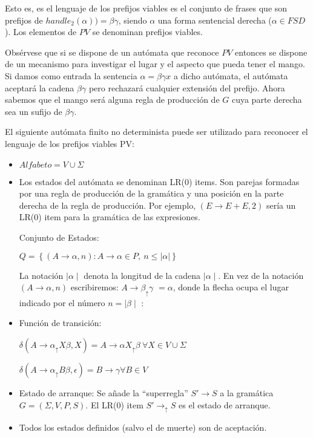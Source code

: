Esto es, es el lenguaje de los prefijos viables es el 
conjunto de frases que son prefijos de 
$handle_2(\alpha)) =  \beta \gamma$, 
siendo $\alpha$ una forma sentencial derecha ($\alpha \in FSD$). Los
elementos de $PV$ se denominan prefijos viables.

Obsérvese que si se dispone de un autómata que reconoce 
$PV$ entonces se dispone de un mecanismo para investigar el lugar y 
el aspecto que pueda tener el mango. Si damos como 
entrada la sentencia $\alpha = \beta \gamma x$
a dicho autómata, el autómata aceptará la cadena $\beta \gamma$ pero rechazará
cualquier extensión del prefijo. Ahora sabemos que el mango 
será alguna regla de producción de $G$ cuya parte derecha 
sea un sufijo de  $\beta \gamma$.

\begin{definition}
\label{definition:eyappslrautomata}
El siguiente autómata finito no determinista puede ser utilizado para
reconocer el lenguaje de los prefijos viables PV:
\begin{itemize}
\item
$Alfabeto = V \cup \Sigma$
\item
Los estados del autómata se denominan LR(0) items. Son parejas formadas
por una regla de producción de la gramática y una posición en la parte derecha 
de la regla de producción. Por ejemplo, $(E \rightarrow E + E, 2)$ sería un
LR(0) item para la gramática de las expresiones.

Conjunto de Estados:

$Q =  \left \{ (A \rightarrow \alpha, n) :  A \rightarrow \alpha \in P,\ n \le |\alpha| \right \}$

 La notación $\mid \alpha \mid$ denota la longitud de la cadena $\mid \alpha \mid$.
 En vez de la notación $(A \rightarrow \alpha, n)$ escribiremos: 
 $A \rightarrow \beta _\uparrow \gamma$ $ = \alpha$, 
 donde la flecha ocupa el lugar indicado por el número $n = \mid \beta \mid$ :
\item
Función de transición:

$\delta(A \rightarrow \alpha _\uparrow X \beta, X) = A \rightarrow \alpha X _\uparrow \beta\ \forall X \in  V \cup \Sigma$ 

$\delta(A \rightarrow \alpha _\uparrow B \beta, \epsilon) = B \rightarrow \gamma  \forall B \in  V$ 
\item
Estado de arranque: Se añade la ``superregla'' $S' \rightarrow S$ a la gramática $G = (\Sigma,V,P,S)$. El LR(0) item 
$S' \rightarrow _\uparrow S$ es el estado de arranque.
\item
Todos los estados definidos (salvo el de muerte) son de aceptación.
\end{itemize}
\end{definition}

